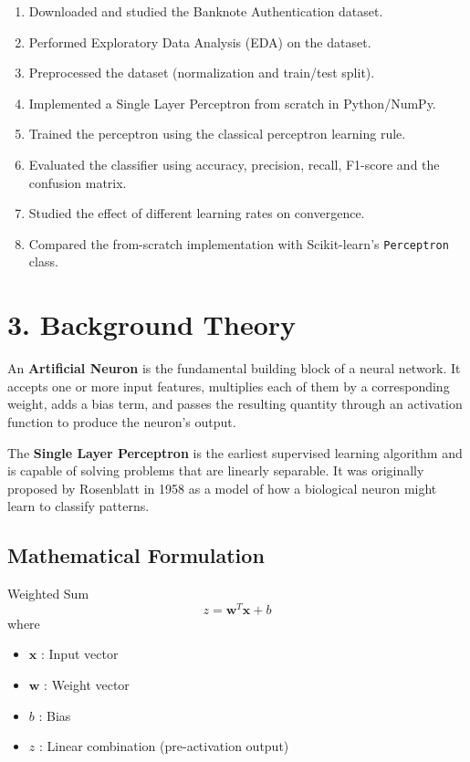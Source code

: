 \documentclass[11pt]{article}
\begin{document}
\begin{enumerate}[leftmargin=*]
\item Downloaded and studied the Banknote Authentication dataset.
\item Performed Exploratory Data Analysis (EDA) on the dataset.
\item Preprocessed the dataset (normalization and train/test split).
\item Implemented a Single Layer Perceptron from scratch in Python/NumPy.
\item Trained the perceptron using the classical perceptron learning rule.
\item Evaluated the classifier using accuracy, precision, recall, F1-score and the confusion matrix.
\item Studied the effect of different learning rates on convergence.
\item Compared the from-scratch implementation with Scikit-learn's \texttt{Perceptron} class.
\end{enumerate}

\section*{3. Background Theory}

An \textbf{Artificial Neuron} is the fundamental building block of a neural network. It accepts one or more input features, multiplies each of them by a corresponding weight, adds a bias term, and passes the resulting quantity through an activation function to produce the neuron's output.

The \textbf{Single Layer Perceptron} is the earliest supervised learning algorithm and is capable of solving problems that are linearly separable. It was originally proposed by Rosenblatt in 1958 as a model of how a biological neuron might learn to classify patterns.

\subsection*{Mathematical Formulation}

Weighted Sum
\[
z=\mathbf{w}^{T}\mathbf{x}+b
\]
where
\begin{itemize}
\item $\mathbf{x}$ : Input vector
\item $\mathbf{w}$ : Weight vector
\item $b$ : Bias
\item $z$ : Linear combination (pre-activation output)
\end{itemize}
\end{document}
